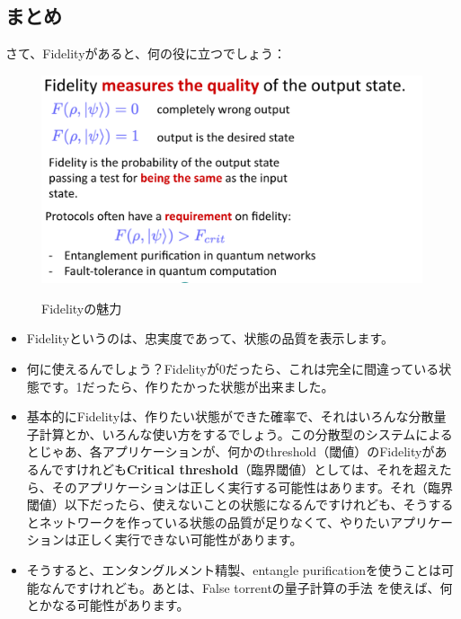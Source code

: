 \subsection{まとめ}
さて、Fidelityがあると、何の役に立つでしょう：
\begin{figure}[H]
    \centering
    \includegraphics[width=1.0\textwidth]{lesson3/summary_fidelity.pdf}
    \label{fig: 1}
    \begin{center}
        \caption{Fidelityの魅力}
    \end{center}
\end{figure}
\begin{itemize}
  \item Fidelityというのは、忠実度であって、状態の品質を表示します。
  \item 何に使えるんでしょう？Fidelityが0だったら、これは完全に間違っている状態です。1だったら、作りたかった状態が出来ました。
  \item 基本的にFidelityは、作りたい状態ができた確率で、それはいろんな分散量子計算とか、いろんな使い方をするでしょう。この分散型のシステムによるとじゃあ、各アプリケーションが、何かのthreshold（閾値）のFidelityがあるんですけれども\textbf{Critical threshold}（臨界閾値）としては、それを超えたら、そのアプリケーションは正しく実行する可能性はあります。それ（臨界閾値）以下だったら、使えないことの状態になるんですけれども、そうするとネットワークを作っている状態の品質が足りなくて、やりたいアプリケーションは正しく実行できない可能性があります。
  \item そうすると、エンタングルメント精製、entangle purificationを使うことは可能なんですけれども。あとは、False torrentの量子計算の手法
を使えば、何とかなる可能性があります。
\end{itemize}



